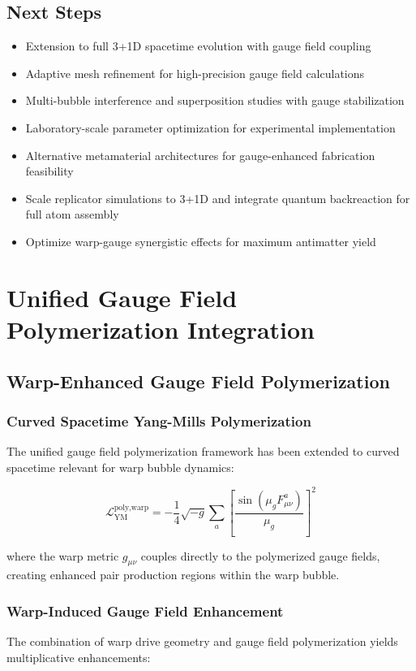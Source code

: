 \documentclass[11pt]{article}
\begin{document}
\subsection{Next Steps}
\begin{itemize}
\item Extension to full 3+1D spacetime evolution with gauge field coupling
\item Adaptive mesh refinement for high-precision gauge field calculations
\item Multi-bubble interference and superposition studies with gauge stabilization
\item Laboratory-scale parameter optimization for experimental implementation
\item Alternative metamaterial architectures for gauge-enhanced fabrication feasibility
\item Scale replicator simulations to 3+1D and integrate quantum backreaction for full atom assembly
\item Optimize warp-gauge synergistic effects for maximum antimatter yield
\end{itemize}

\section{Unified Gauge Field Polymerization Integration}

\subsection{Warp-Enhanced Gauge Field Polymerization}

\subsubsection{Curved Spacetime Yang-Mills Polymerization}
The unified gauge field polymerization framework has been extended to curved spacetime relevant for warp bubble dynamics:

\begin{equation}
\mathcal{L}_{\text{YM}}^{\text{poly,warp}} = -\frac{1}{4}\sqrt{-g} \sum_a \left[\frac{\sin(\mu_g F^a_{\mu\nu})}{\mu_g}\right]^2
\end{equation}

where the warp metric $g_{\mu\nu}$ couples directly to the polymerized gauge fields, creating enhanced pair production regions within the warp bubble.

\subsubsection{Warp-Induced Gauge Field Enhancement}
The combination of warp drive geometry and gauge field polymerization yields multiplicative enhancements:
\end{document}
